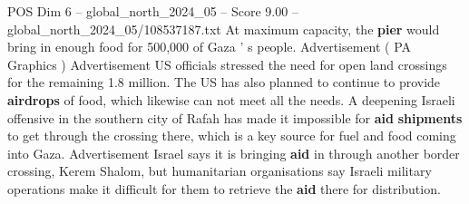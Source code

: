 \begin{textsample}{POS Dim 6 – global\_north\_2024\_05 – Score 9.00 – global\_north\_2024\_05/108537187.txt}
At maximum capacity, the \textbf{pier} would bring in enough food for 500,000 of Gaza ' s people.
Advertisement ( PA Graphics ) Advertisement US officials stressed the need for open land crossings for the remaining 1.8 million.
The US has also planned to continue to provide \textbf{airdrops} of food, which likewise can not meet all the needs.
A deepening Israeli offensive in the southern city of Rafah has made it impossible for \textbf{aid} \textbf{shipments} to get through the crossing there, which is a key source for fuel and food coming into Gaza.
Advertisement Israel says it is bringing \textbf{aid} in through another border crossing, Kerem Shalom, but humanitarian organisations say Israeli military operations make it difficult for them to retrieve the \textbf{aid} there for distribution.

\end{textsample}
